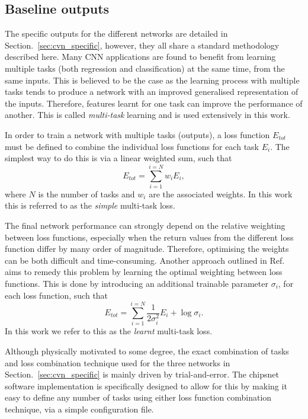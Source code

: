 \subsection{Baseline outputs} %
\label{sec:cvn_baseline_outputs} %

The specific outputs for the different networks are detailed in Section.~\ref{sec:cvn_specific},
however, they all share a standard methodology described here. Many CNN applications are found to
benefit from learning multiple tasks (both regression and classification) at the same time, from
the same inputs. This is believed to be the case as the learning process with multiple tasks tends
to produce a network with an improved generalised representation of the inputs. Therefore,
features learnt for one task can improve the performance of another. This is called
\emph{multi-task} learning and is used extensively in this work.

In order to train a network with multiple tasks (outputs), a loss function $E_{tot}$ must be
defined to combine the individual loss functions for each task $E_{i}$. The simplest way to do
this is via a linear weighted sum, such that
\begin{equation}
    E_{tot} = \sum_{i=1}^{i=N}w_{i}E_{i},
    \label{eq:multi_simple}
\end{equation}
where $N$ is the number of tasks and $w_{i}$ are the associated weights. In this work this is
referred to as the \emph{simple} multi-task loss.

The final network performance can strongly depend on the relative weighting between loss
functions, especially when the return values from the different loss function differ by many order
of magnitude. Therefore, optimising the weights can be both difficult and time-consuming. Another
approach outlined in Ref.~\cite{kendall2018} aims to remedy this problem by learning the optimal
weighting between loss functions. This is done by introducing an additional trainable parameter
$\sigma_{i}$, for each loss function, such that
\begin{equation}
    E_{tot}= \sum_{i=1}^{i=N}\frac{1}{2\sigma_{i}^2}E_{i}+ \log\sigma_{i}.
    \label{eq:multi_learnt}
\end{equation}
In this work we refer to this as the \emph{learnt} multi-task loss.

Although physically motivated to some degree, the exact combination of tasks and loss combination
technique used for the three networks in Section.~\ref{sec:cvn_specific} is mainly driven by
trial-and-error. The chipsnet software implementation is specifically designed to allow for this
by making it easy to define any number of tasks using either loss function combination technique,
via a simple configuration file.

